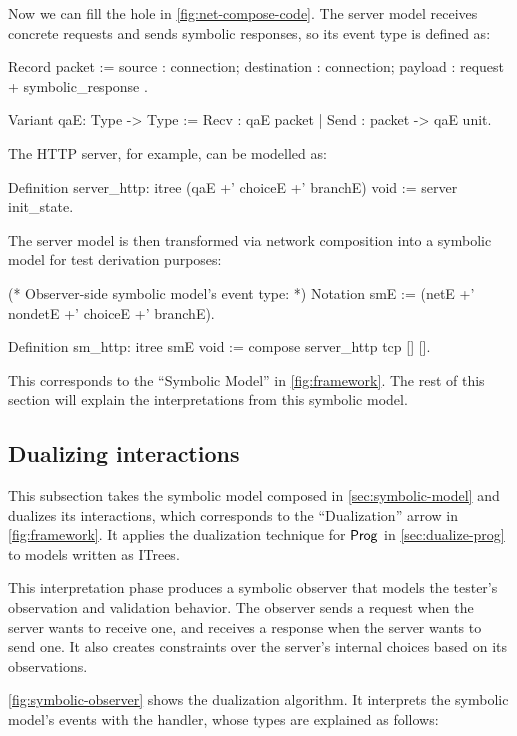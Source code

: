 Now we can fill the hole  in \autoref{fig:net-compose-code}.  The
server model receives concrete requests and sends symbolic responses, so its
event type is defined as:
\begin{coq}
  Record packet := {
    source      : connection;
    destination : connection;
    payload     : request + symbolic_response
  }.

  Variant qaE: Type -> Type :=
    Recv : qaE packet
  | Send : packet -> qaE unit.
\end{coq}

The HTTP server, for example, can be modelled as:
\begin{coq}
  Definition server_http: itree (qaE +' choiceE +' branchE) void :=
    server init_state.
\end{coq}

The server model is then transformed via network composition into a symbolic
model for test derivation purposes:
\begin{coq}
  (* Observer-side symbolic model's event type: *)
  Notation smE := (netE +' nondetE +' choiceE +' branchE).
  
  Definition sm_http: itree smE void :=
    compose server_http tcp [] [].
\end{coq}

This corresponds to the ``Symbolic Model'' in \autoref{fig:framework}.  The rest
of this section will explain the interpretations from this symbolic model.

\subsection{Dualizing interactions}
\label{sec:dualize-interaction}
This subsection takes the symbolic model composed in
\autoref{sec:symbolic-model} and dualizes its interactions, which corresponds to
the ``Dualization'' arrow in \autoref{fig:framework}.  It applies the
dualization technique for $\mathsf{Prog}$ in \autoref{sec:dualize-prog} to models
written as ITrees.

This interpretation phase produces a symbolic observer that models the tester's
observation and validation behavior.  The observer sends a request when the
server wants to receive one, and receives a response when the server wants to
send one.  It also creates constraints over the server's internal choices based
on its observations.

\autoref{fig:symbolic-observer} shows the dualization algorithm.  It interprets
the symbolic model's events with the  handler, whose types are
explained as follows:

